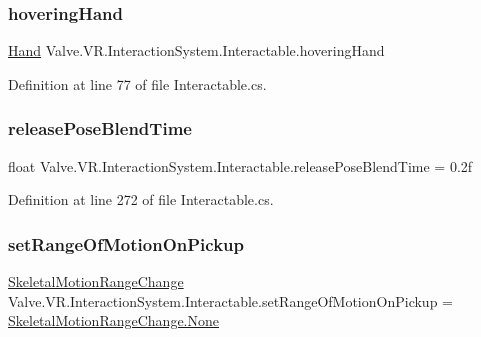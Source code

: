\subsubsection{\texorpdfstring{hoveringHand}{hoveringHand}}
{\footnotesize\ttfamily \mbox{\hyperlink{class_valve_1_1_v_r_1_1_interaction_system_1_1_hand}{Hand}} Valve.\+V\+R.\+Interaction\+System.\+Interactable.\+hovering\+Hand}



Definition at line 77 of file Interactable.\+cs.

\mbox{\label{class_valve_1_1_v_r_1_1_interaction_system_1_1_interactable_afcc8f08198ce95e8da914f46cb836fe0}} 
\subsubsection{\texorpdfstring{releasePoseBlendTime}{releasePoseBlendTime}}
{\footnotesize\ttfamily float Valve.\+V\+R.\+Interaction\+System.\+Interactable.\+release\+Pose\+Blend\+Time = 0.\+2f\hspace{0.3cm}{\ttfamily [protected]}}



Definition at line 272 of file Interactable.\+cs.

\mbox{\label{class_valve_1_1_v_r_1_1_interaction_system_1_1_interactable_a7d89faa46f0f9dcd8f182b210194d84d}} 
\subsubsection{\texorpdfstring{setRangeOfMotionOnPickup}{setRangeOfMotionOnPickup}}
{\footnotesize\ttfamily \mbox{\hyperlink{namespace_valve_1_1_v_r_aabb506007a41244de5c315ff5519439f}{Skeletal\+Motion\+Range\+Change}} Valve.\+V\+R.\+Interaction\+System.\+Interactable.\+set\+Range\+Of\+Motion\+On\+Pickup = \mbox{\hyperlink{namespace_valve_1_1_v_r_aabb506007a41244de5c315ff5519439fa6adf97f83acf6453d4a6a4b1070f3754}{Skeletal\+Motion\+Range\+Change.\+None}}}



